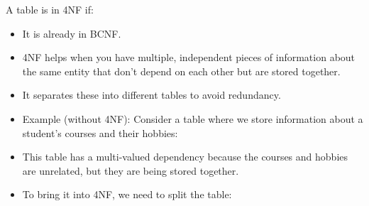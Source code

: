 \setlength{\columnsep}{3pt}
\begin{flushleft}

	A table is in 4NF if:
	\begin{itemize}
		\item It is already in BCNF.
		\item 4NF helps when you have multiple, independent pieces of information about the same entity that don't depend on each other but are stored together. 
		\item It separates these into different tables to avoid redundancy.
		
		\item Example (without 4NF): Consider a table where we store information about a student's courses and their hobbies:
		
		
		\item This table has a multi-valued dependency because the courses and hobbies are unrelated, but they are being stored together.
		
		\item To bring it into 4NF, we need to split the table:

		
		
	\end{itemize}	
	
\end{flushleft}

\newpage

